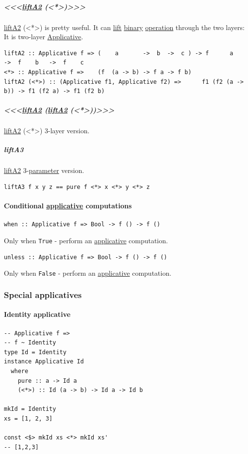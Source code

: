 \documentclass[a4paper,14pt,oneside]{book}
\begin{document}
\subparagraph{<<<\hyperref[orgc723306]{liftA2} (<*>)>>>}
\label{sec:org67d0057}
\hyperref[orgc723306]{liftA2} (<*>) is pretty useful. It can \hyperref[org5fb715a]{lift} \hyperref[org1e356fa]{binary} \hyperref[orgf96349c]{operation} through the two layers:
It is two-layer \hyperref[org805216c]{Applicative}.
\begin{verbatim}
liftA2 :: Applicative f => (    a       ->  b  ->  c ) -> f      a        ->  f    b   ->  f    c
<*> :: Applicative f =>    (f  (a -> b) -> f a -> f b)
liftA2 (<*>) :: (Applicative f1, Applicative f2) =>      f1 (f2 (a -> b)) -> f1 (f2 a) -> f1 (f2 b)
\end{verbatim}

\subparagraph{<<<\hyperref[orgc723306]{liftA2} (\hyperref[orgc723306]{liftA2} (<*>))>>>}
\label{sec:org7a564e1}
\hyperref[orgc723306]{liftA2} (<*>) 3-layer version.

\subparagraph{\label{org1e29b57}liftA3}
\label{sec:orga3418b4}
\hyperref[orgc723306]{liftA2} 3-\hyperref[org08c9428]{parameter} version.

\begin{verbatim}
liftA3 f x y z == pure f <*> x <*> y <*> z
\end{verbatim}

\paragraph{Conditional \hyperref[org805216c]{applicative} computations}
\label{sec:orgdc3f948}
\begin{verbatim}
when :: Applicative f => Bool -> f () -> f ()
\end{verbatim}

Only when \texttt{True} - perform an \hyperref[org805216c]{applicative} computation.

\begin{verbatim}
unless :: Applicative f => Bool -> f () -> f ()
\end{verbatim}

Only when \texttt{False} - perform an \hyperref[org805216c]{applicative} computation.

\subsubsection{\label{org4f6455d}Special applicatives}
\label{sec:org82e4165}
\paragraph{\label{org1438fda}Identity applicative}
\label{sec:org605a51b}
\begin{verbatim}
-- Applicative f =>
-- f ~ Identity
type Id = Identity
instance Applicative Id
  where
    pure :: a -> Id a
    (<*>) :: Id (a -> b) -> Id a -> Id b

mkId = Identity
xs = [1, 2, 3]

const <$> mkId xs <*> mkId xs'
-- [1,2,3]
\end{verbatim}
\end{document}
